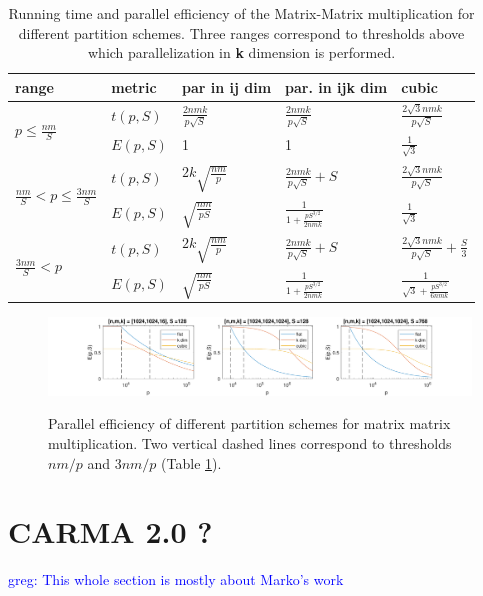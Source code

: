 \documentclass[sigconf]{acmart}
\newcommand\greg[1]{\textcolor{blue}{greg: #1}}
\begin{document}
\begin{table}[t]
	\label{tab:mmmEfficiency}
	\caption{Running time and parallel efficiency of the Matrix-Matrix 
		multiplication for different partition schemes. Three ranges correspond 
		to thresholds above which parallelization in \textbf{k} dimension is 
		performed.}
	\begin{tabular}{l|l|l|l|l}
		range & metric & par in \textbf{ij} dim &par. 
		in \textbf{ijk} dim & cubic \\
		\hline
		\multirow{2}{*}{$p \le \frac{nm}{S}$} & $t(p,S)$ & 
		$\frac{2nmk}{p\sqrt{S}}$ & $\frac{2nmk}{p\sqrt{S}}$ & 
		$\frac{2\sqrt{3}nmk}{p\sqrt{S}}$ \\
		& $E(p,S)$ & 1 & 1 & 	$\frac{1}{\sqrt{3}}$\\
		\hline
		\multirow{2}{*}{$\frac{nm}{S} < p \le \frac{3nm}{S}$} & $t(p,S)$ & $2k 
		\sqrt{\frac{nm}{p}}$ & 
		$\frac{2nmk}{p\sqrt{S}} + S$ &  $\frac{2\sqrt{3}nmk}{p\sqrt{S}}$  
		\\		
		& $E(p,S)$ & $\sqrt{\frac{nm}{pS}}$ & $\frac{1}{1 + 
			\frac{pS^{3/2}}{2nmk}}$ & 	$\frac{1}{\sqrt{3}}$ \\
		\hline
		\multirow{2}{*}{$\frac{3nm}{S} < p$} & $t(p,S)$ & $2k 
		\sqrt{\frac{nm}{p}}$ & 
		$\frac{2nmk}{p\sqrt{S}} + S$ & $\frac{2\sqrt{3}nmk}{p\sqrt{S}} + 
		\frac{S}{3}$\\
		& $E(p,S)$ &	$\sqrt{\frac{nm}{pS}}$ & $\frac{1}{1 + 
			\frac{pS^{3/2}}{2nmk}}$ &	$\frac{1}{\sqrt{3} + 
			\frac{pS^{3/2}}{6nmk}}$
	\end{tabular}
\end{table}


\begin{figure}[t]
	\hspace*{-1.5cm}
	\includegraphics[width=2.5\columnwidth]{figures/mmmScaling}
	\label{fig:mmmScaling}
	\caption{Parallel efficiency of different partition schemes for matrix 
		matrix multiplication. Two vertical dashed lines correspond to 
		thresholds 
		$nm/p$ and $3nm/p$ (Table \ref{tab:mmmEfficiency}).}
\end{figure}

\section{CARMA 2.0 ?}
\greg{This whole section is mostly about Marko's work}
\end{document}
